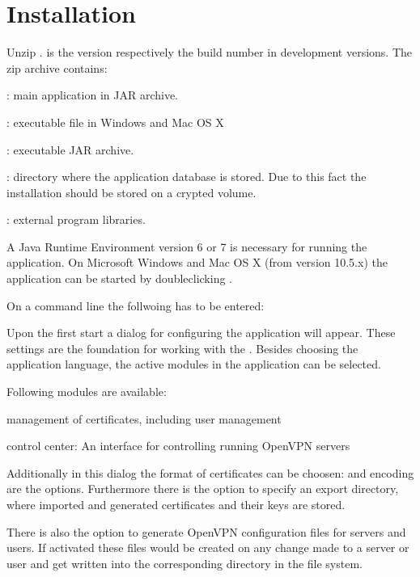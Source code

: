 
\section{Installation}

%
Unzip \Nvma{}. \Nbn{} is the version respectively the build number in
development versions.
%
\nl The zip archive contains:
%
\begin{items}
 \item   \Nvmj{}: main application in JAR archive.
 \item   \Nvmw{}: executable file in Windows and Mac OS X
 \item   \Nvms{}: executable JAR archive.
 \item   {}: directory where the application database is stored.
 Due to this fact the installation should be stored on a crypted volume.
 \item   {}: external program libraries.
\end{items}

%
A Java Runtime Environment version 6 or 7 is necessary for running the
application.
%
%
On Microsoft Windows and Mac OS X (from version 10.5.x) the application can
be started by
doubleclicking \Nvms{}.
%

On a command line the follwoing has to be entered:


%
Upon the first start a dialog for configuring the application will appear.
These settings are the foundation for working with the \Nbms.
Besides choosing the application language, the active modules in the
application can be selected.

\nl Following modules are available:

\begin{items}
 \item management of certificates, including user management
 \item control center: An interface for controlling running OpenVPN
       servers
\end{items}

\nl Additionally in this dialog the format of certificates can be
    choosen:
	 and  encoding are the options.
%
Furthermore there is the option to specify an export directory, where
imported and generated certificates and their keys are stored.

%
There is also the option to generate OpenVPN configuration files for servers
and users. If activated these files would be created on any change made to a 
server or user and get written into the corresponding directory in the file 
system.

